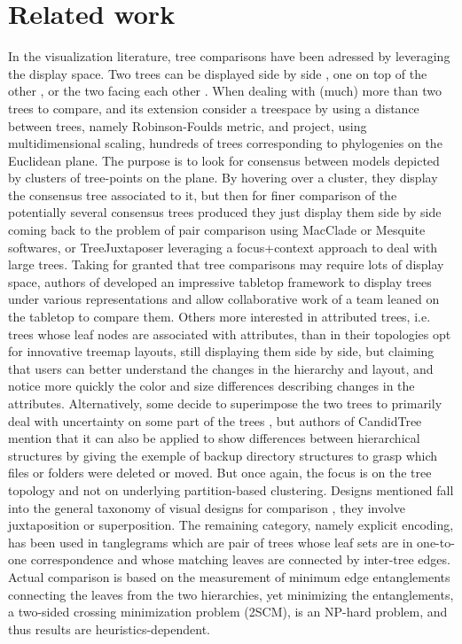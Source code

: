 \documentclass[10pt,conference,a4paper]{IEEEtran}
\begin{document}
\section{Related work}

In the visualization literature, tree comparisons have been adressed by leveraging the display space. Two trees can be displayed side by side \cite{TreeJuxtaposer}, one on top of the other \cite{CandidTree}, or the two facing each other \cite{VizHOD}. When dealing with (much) more than two trees to compare, \cite{TreeSet} and its extension \cite{hillis2005analysis} consider a treespace by using a distance between trees, namely Robinson-Foulds metric, and project, using multidimensional scaling, hundreds of trees corresponding to phylogenies on the Euclidean plane. The purpose is to look for consensus between models depicted by clusters of tree-points on the plane. By hovering over a cluster, they display the consensus tree associated to it, but then for finer comparison of the potentially several consensus trees produced they just display them side by side coming back to the problem of pair comparison using MacClade or Mesquite softwares, or TreeJuxtaposer \cite{TreeJuxtaposer} leveraging a focus+context approach to deal with large trees. Taking for granted that tree comparisons may require lots of display space, authors of \cite{isenberg2007interactive} developed an impressive tabletop framework to display trees under various representations and allow collaborative work of a team leaned on the tabletop to compare them. Others more interested in attributed trees, i.e. trees whose leaf nodes are associated with attributes, than in their topologies \cite{tu2007visualizing} opt for innovative treemap layouts, still displaying them side by side, but claiming that users can better understand the changes in the hierarchy and layout, and notice more quickly the color and size differences describing changes in the attributes. Alternatively, some decide to superimpose the two trees to primarily deal with uncertainty on some part of the trees \cite{CandidTree}, but authors of CandidTree mention that it can also be applied to show differences between hierarchical structures by giving the exemple of backup directory structures to grasp which files or folders were deleted or moved. But once again, the focus is on the tree topology and not on underlying partition-based clustering. Designs mentioned fall into the general taxonomy of visual designs for comparison 
\cite{gleicher2011visual}, they involve juxtaposition or superposition. The remaining category, namely explicit encoding, has been used in tanglegrams \cite{nollenburg2009drawing, galili2015dendextend} which are pair of trees whose leaf sets are in one-to-one correspondence and whose matching leaves are connected by inter-tree edges. Actual comparison is based on the measurement of minimum edge entanglements connecting the leaves from the two hierarchies, yet minimizing the entanglements, a two-sided crossing minimization problem (2SCM), is an NP-hard problem, and thus results are heuristics-dependent.
\end{document}
